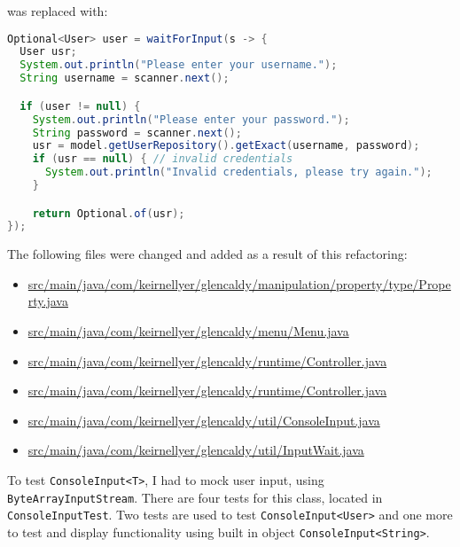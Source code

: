 \documentclass{article}
\newcommand{\code}[1]{\texttt{#1}}
\begin{document}
\noindent was replaced with:
\begin{lstlisting}[language=Java]
Optional<User> user = waitForInput(s -> {
  User usr;
  System.out.println("Please enter your username.");
  String username = scanner.next();

  if (user != null) {
    System.out.println("Please enter your password.");
    String password = scanner.next();
    usr = model.getUserRepository().getExact(username, password);
    if (usr == null) { // invalid credentials
      System.out.println("Invalid credentials, please try again.");
    }

    return Optional.of(usr);
});
\end{lstlisting}

The following files were changed and added as a result of this refactoring:
\begin{itemize}
  \item \href{https://github.com/awave1/assessment-loan-system/commit/bd538f05a6fbff8283b397c9a265040ab082542d#diff-1c55a45f266eb74be0a94a96e52a6c2a}{src/main/java/com/keirnellyer/glencaldy/manipulation/property/type/Property.java}
  \item \href{https://github.com/awave1/assessment-loan-system/commit/bd538f05a6fbff8283b397c9a265040ab082542d#diff-d9f6cc6de5b899354d46d7795b29022c}{src/main/java/com/keirnellyer/glencaldy/menu/Menu.java}
  \item \href{https://github.com/awave1/assessment-loan-system/commit/bd538f05a6fbff8283b397c9a265040ab082542d#diff-0f417f930dba04b27baaa509b7b80bbf}{src/main/java/com/keirnellyer/glencaldy/runtime/Controller.java}
  \item \href{https://github.com/awave1/assessment-loan-system/commit/bd538f05a6fbff8283b397c9a265040ab082542d#diff-a28d2a28f9e29d7231bd79421f225da1}{src/main/java/com/keirnellyer/glencaldy/runtime/Controller.java}
  \item \href{https://github.com/awave1/assessment-loan-system/commit/bd538f05a6fbff8283b397c9a265040ab082542d#diff-a28d2a28f9e29d7231bd79421f225da1}{src/main/java/com/keirnellyer/glencaldy/util/ConsoleInput.java}
  \item \href{https://github.com/awave1/assessment-loan-system/commit/bd538f05a6fbff8283b397c9a265040ab082542d#diff-c2879e1c4aeb580d558cae1973565454}{src/main/java/com/keirnellyer/glencaldy/util/InputWait.java}
\end{itemize}

To test \code{ConsoleInput<T>}, I had to mock user input, using \code{ByteArrayInputStream}. There are four tests for this class, located in \code{ConsoleInputTest}. Two tests are used to test \code{ConsoleInput<User>} and one more to test and display functionality using built in object \code{ConsoleInput<String>}.
\end{document}
